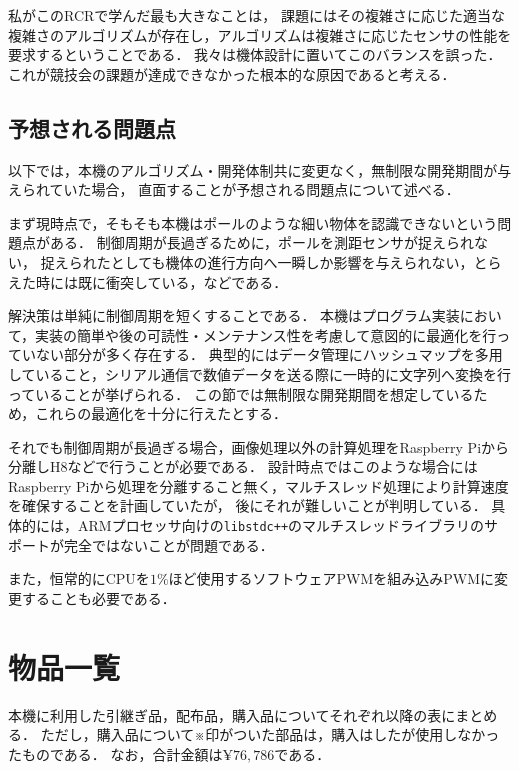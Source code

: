 \documentclass[11pt,a4]{jsarticle}
\begin{document}
    私がこのRCRで学んだ最も大きなことは，
    課題にはその複雑さに応じた適当な複雑さのアルゴリズムが存在し，アルゴリズムは複雑さに応じたセンサの性能を要求するということである．
    我々は機体設計に置いてこのバランスを誤った．
    これが競技会の課題が達成できなかった根本的な原因であると考える．

  \subsection{予想される問題点}
    以下では，本機のアルゴリズム・開発体制共に変更なく，無制限な開発期間が与えられていた場合，
    直面することが予想される問題点について述べる．

    まず現時点で，そもそも本機はポールのような細い物体を認識できないという問題点がある．
    制御周期が長過ぎるために，ポールを測距センサが捉えられない，
    捉えられたとしても機体の進行方向へ一瞬しか影響を与えられない，とらえた時には既に衝突している，などである．

    解決策は単純に制御周期を短くすることである．
    本機はプログラム実装において，実装の簡単や後の可読性・メンテナンス性を考慮して意図的に最適化を行っていない部分が多く存在する．
    典型的にはデータ管理にハッシュマップを多用していること，シリアル通信で数値データを送る際に一時的に文字列へ変換を行っていることが挙げられる．
    この節では無制限な開発期間を想定しているため，これらの最適化を十分に行えたとする．

    それでも制御周期が長過ぎる場合，画像処理以外の計算処理をRaspberry Piから分離しH8などで行うことが必要である．
    設計時点ではこのような場合にはRaspberry Piから処理を分離すること無く，マルチスレッド処理により計算速度を確保することを計画していたが，
    後にそれが難しいことが判明している．
    具体的には，ARMプロセッサ向けの\texttt{libstdc++}のマルチスレッドライブラリのサポートが完全ではないことが問題である．

    また，恒常的にCPUを$1\%$ほど使用するソフトウェアPWMを組み込みPWMに変更することも必要である．

\newpage
\section{物品一覧}

  本機に利用した引継ぎ品，配布品，購入品についてそれぞれ以降の表にまとめる．
  ただし，購入品について※印がついた部品は，購入はしたが使用しなかったものである．
  なお，合計金額は$\yen 76,786$である．
\end{document}
